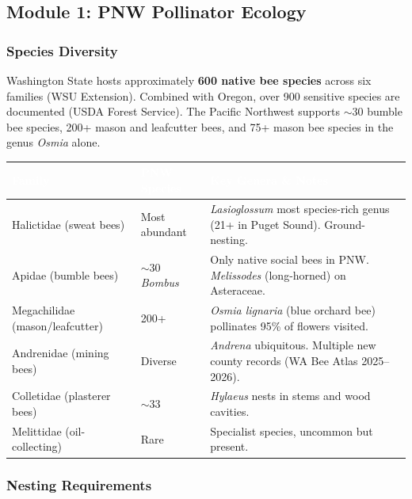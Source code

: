 \documentclass[11pt,letterpaper]{article}
\newcommand{\tableheader}[1]{\textbf{\sffamily\textcolor{white}{#1}}}
\begin{document}

\subsection{Module 1: PNW Pollinator Ecology}

\subsubsection{Species Diversity}

Washington State hosts approximately \textbf{600 native bee species} across six families (WSU Extension). Combined with Oregon, over 900 sensitive species are documented (USDA Forest Service). The Pacific Northwest supports $\sim$30 bumble bee species, 200+ mason and leafcutter bees, and 75+ mason bee species in the genus \textit{Osmia} alone.

\begin{center}
\begin{tabularx}{\textwidth}{L{3.5cm}C{2cm}X}
\toprule
{}
\tableheader{Family} & \tableheader{PNW Species} & \tableheader{Key Genera \& Notes} \\
\midrule
Halictidae (sweat bees) & Most abundant & \textit{Lasioglossum} most species-rich genus (21+ in Puget Sound). Ground-nesting. \\
Apidae (bumble bees) & $\sim$30 \textit{Bombus} & Only native social bees in PNW. \textit{Melissodes} (long-horned) on Asteraceae. \\
Megachilidae (mason/leafcutter) & 200+ & \textit{Osmia lignaria} (blue orchard bee) pollinates 95\% of flowers visited. \\
Andrenidae (mining bees) & Diverse & \textit{Andrena} ubiquitous. Multiple new county records (WA Bee Atlas 2025--2026). \\
Colletidae (plasterer bees) & $\sim$33 & \textit{Hylaeus} nests in stems and wood cavities. \\
Melittidae (oil-collecting) & Rare & Specialist species, uncommon but present. \\
\bottomrule
\end{tabularx}
\end{center}

\subsubsection{Nesting Requirements}
\end{document}
